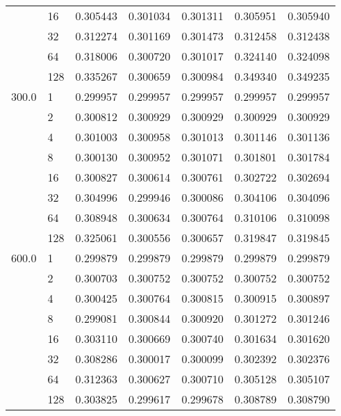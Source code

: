 \begin{tabular}{llrrrrr}
      & 16  &  0.305443 &  0.301034 &  0.301311 &  0.305951 &  0.305940 \\
      & 32  &  0.312274 &  0.301169 &  0.301473 &  0.312458 &  0.312438 \\
      & 64  &  0.318006 &  0.300720 &  0.301017 &  0.324140 &  0.324098 \\
      & 128 &  0.335267 &  0.300659 &  0.300984 &  0.349340 &  0.349235 \\
300.0 & 1   &  0.299957 &  0.299957 &  0.299957 &  0.299957 &  0.299957 \\
      & 2   &  0.300812 &  0.300929 &  0.300929 &  0.300929 &  0.300929 \\
      & 4   &  0.301003 &  0.300958 &  0.301013 &  0.301146 &  0.301136 \\
      & 8   &  0.300130 &  0.300952 &  0.301071 &  0.301801 &  0.301784 \\
      & 16  &  0.300827 &  0.300614 &  0.300761 &  0.302722 &  0.302694 \\
      & 32  &  0.304996 &  0.299946 &  0.300086 &  0.304106 &  0.304096 \\
      & 64  &  0.308948 &  0.300634 &  0.300764 &  0.310106 &  0.310098 \\
      & 128 &  0.325061 &  0.300556 &  0.300657 &  0.319847 &  0.319845 \\
600.0 & 1   &  0.299879 &  0.299879 &  0.299879 &  0.299879 &  0.299879 \\
      & 2   &  0.300703 &  0.300752 &  0.300752 &  0.300752 &  0.300752 \\
      & 4   &  0.300425 &  0.300764 &  0.300815 &  0.300915 &  0.300897 \\
      & 8   &  0.299081 &  0.300844 &  0.300920 &  0.301272 &  0.301246 \\
      & 16  &  0.303110 &  0.300669 &  0.300740 &  0.301634 &  0.301620 \\
      & 32  &  0.308286 &  0.300017 &  0.300099 &  0.302392 &  0.302376 \\
      & 64  &  0.312363 &  0.300627 &  0.300710 &  0.305128 &  0.305107 \\
      & 128 &  0.303825 &  0.299617 &  0.299678 &  0.308789 &  0.308790 \\
\bottomrule
\end{tabular}

